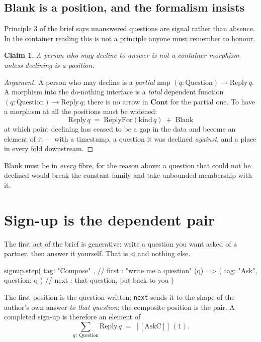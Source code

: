 \documentclass[11pt,a4paper]{article}
\newtheorem*{claim}{Claim}
\newcommand{\llbracket}{[\![}
\newcommand{\rrbracket}{]\!]}
\newcommand{\seq}{\mathbin{\triangleleft}}
\newcommand{\AskC}{\mathrm{AskC}}
\newcommand{\Reply}{\mathrm{Reply}}
\newcommand{\Question}{\mathrm{Question}}
\begin{document}
\subsection{Blank is a position, and the formalism insists}

Principle 3 of the brief says unanswered questions are signal rather than
absence. In the container reading this is not a principle anyone must remember
to honour.

\begin{claim}
A person who may decline to answer is not a container morphism unless declining
is a position.
\end{claim}

\begin{proof}[Argument]
A person who may decline is a \emph{partial} map $(q : \Question) \rightharpoonup
\Reply\,q$. A morphism into the do-nothing interface is a \emph{total} dependent
function $(q : \Question) \to \Reply\,q$; there is no arrow in $\mathbf{Cont}$
for the partial one. To have a morphism at all the positions must be widened:
\[
  \Reply\,q \;=\; \mathrm{ReplyFor}(\mathrm{kind}\,q) \;+\; \mathrm{Blank}
\]
at which point declining has ceased to be a gap in the data and become an
element of it --- with a timestamp, a question it was declined \emph{against},
and a place in every fold downstream.
\end{proof}

$\mathrm{Blank}$ must be in \emph{every} fibre, for the reason above: a question
that could not be declined would break the constant family and take unbounded
membership with it.

\section{Sign-up is the dependent pair}

The first act of the brief is generative: write a question you want asked of a
partner, then answer it yourself. That is $\seq$ and nothing else.

\begin{term}
signup.step(
  { tag: "Compose" },                  // first : "write me a question"
  (q) => ({ tag: "Ask", question: q }) // next  : that question, put back to you
)
\end{term}

The first position is the question written; \texttt{next} sends it to the shape
of the author's own answer \emph{to that question}; the composite position is the
pair. A completed sign-up is therefore an element of
\[
  \textstyle\sum_{q \,:\, \Question} \Reply\,q \;=\; \llbracket \AskC \rrbracket\,(1).
\]
\end{document}
